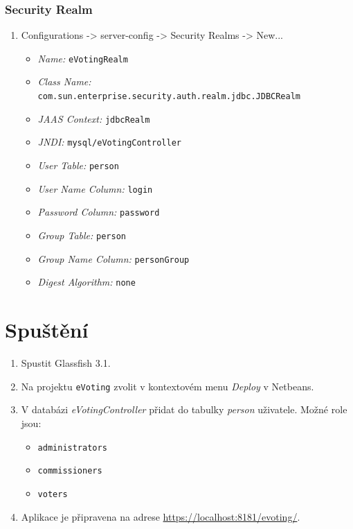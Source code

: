 \documentclass[11pt,twoside,a4paper]{book}
\begin{document}
\subsubsection{Security Realm}

\begin{enumerate}
    \item Configurations -> server-config -> Security Realms -> New...
    	\begin{itemize}  
        	\item \textit{Name:} \texttt{eVotingRealm}
        	\item \textit{Class Name:} \texttt{com.sun.enterprise.security.auth.realm.jdbc.JDBCRealm}
        	\item \textit{JAAS Context:} \texttt{jdbcRealm}
        	\item \textit{JNDI:} \texttt{mysql/eVotingController}
        	\item \textit{User Table:} \texttt{person}
        	\item \textit{User Name Column:} \texttt{login}
        	\item \textit{Password Column:} \texttt{password}
        	\item \textit{Group Table:} \texttt{person}
        	\item \textit{Group Name Column:} \texttt{personGroup}
        	\item \textit{Digest Algorithm:} \texttt{none}
        \end{itemize}
\end{enumerate}

\section{Spuštění}

\begin{enumerate}	
	\item Spustit Glassfish 3.1.
	\item Na projektu \texttt{eVoting} zvolit v kontextovém menu \textit{Deploy} v Netbeans.
	\item V databázi \textit{eVotingController} přidat do tabulky \textit{person} uživatele. Možné role jsou:
		\begin{itemize}
			\item \texttt{administrators}
			\item \texttt{commissioners}
			\item \texttt{voters}
		\end{itemize}  
	\item Aplikace je připravena na adrese \url{https://localhost:8181/evoting/}.
\end{enumerate}
\end{document}
